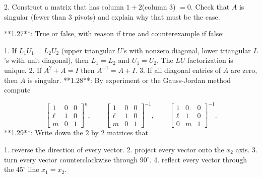 2. Construct a matrix that has column \(1+2\)(column \(3\)) \(=0\). Check that \(A\) is singular (fewer than \(3\) pivots) and explain why that must be the case.

**1.27**: True or false, with reason if true and counterexample if false:

1. If \(L_{1}U_{1}=L_{2}U_{2}\) (upper triangular \(U\)'s with nonzero diagonal, lower triangular \(L\)'s with unit diagonal), then \(L_{1}=L_{2}\) and \(U_{1}=U_{2}\). The \(LU\) factorization is unique.
2. If \(A^{2}+A=I\) then \(A^{-1}=A+I\).
3. If all diagonal entries of \(A\) are zero, then \(A\) is singular.
**1.28**: By experiment or the Gauss-Jordan method compute

\[\begin{bmatrix}1&0&0\\ \ell&1&0\\ m&0&1\end{bmatrix}^{n},\qquad\begin{bmatrix}1&0&0\\ \ell&1&0\\ m&0&1\end{bmatrix}^{-1},\qquad\begin{bmatrix}1&0&0\\ \ell&1&0\\ 0&m&1\end{bmatrix}^{-1}.\]
**1.29**: Write down the \(2\) by \(2\) matrices that

1. reverse the direction of every vector.
2. project every vector onto the \(x_{2}\) axis.
3. turn every vector counterclockwise through \(90^{\circ}\).
4. reflect every vector through the \(45^{\circ}\) line \(x_{1}=x_{2}\).

 